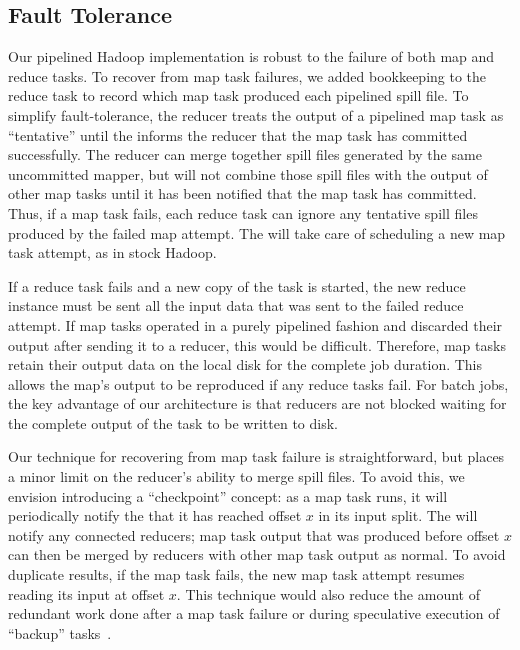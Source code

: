 \subsection{Fault Tolerance}
\label{ch:hop:sec:ft}


Our pipelined Hadoop implementation is robust to the failure of both
map and reduce tasks. To recover from map task failures, we added
bookkeeping to the reduce task to record which map task produced each
pipelined spill file. To simplify fault-tolerance, the reducer treats
the output of a pipelined map task as ``tentative'' until the {\JT}
informs the reducer that the map task has committed successfully. The
reducer can merge together spill files generated by the same
uncommitted mapper, but will not combine those spill files with the
output of other map tasks until it has been notified that the map task
has committed. Thus, if a map task fails, each reduce task can ignore
any tentative spill files produced by the failed map attempt. The
{\JT} will take care of scheduling a new map task attempt, as in stock
Hadoop. 

If a reduce task fails and a new copy of the task is started, the new
reduce instance must be sent all the input data that was sent to the
failed reduce attempt. If map tasks operated in a purely pipelined
fashion and discarded their output after sending it to a reducer, this
would be difficult. Therefore, map tasks retain their output data on
the local disk for the complete job duration. This allows the map's output to be 
reproduced if any reduce tasks fail. For batch jobs, the key advantage of our architecture is
that reducers are not blocked waiting for the complete output of the
task to be written to disk.

Our technique for recovering from map task failure is straightforward, but
places a minor limit on the reducer's ability to merge spill files. To avoid
this, we envision introducing a ``checkpoint'' concept: as a map task runs, it
will periodically notify the {\JT} that it has reached offset $x$ in its input
split. The {\JT} will notify any connected reducers; map task output that was
produced before offset $x$ can then be merged by reducers with other map task
output as normal. To avoid duplicate results, if the map task fails, the new map
task attempt resumes reading its input at offset $x$. This technique would also
reduce the amount of redundant work done after a map task failure or during
speculative execution of ``backup'' tasks~\cite{mapreduce-osdi}.


